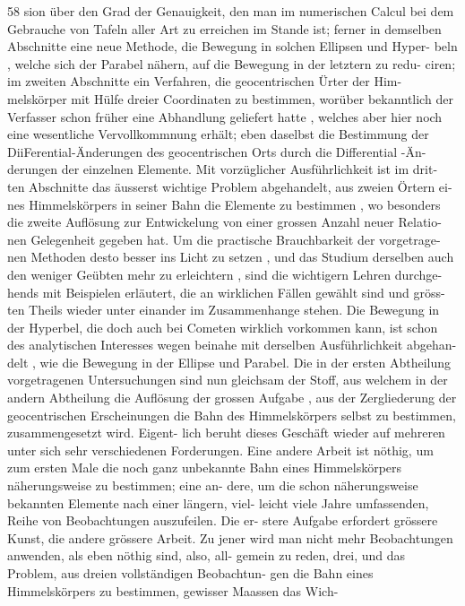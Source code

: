 \documentclass[12pt,a4paper]{article}
\begin{document}
\newpage

58
sion  über  den  Grad  der  Genauigkeit,  den  man  im  numerischen  Calcul  bei  dem
Gebrauche  von  Tafeln  aller  Art  zu  erreichen  im  Stande  ist;  ferner  in  demselben
Abschnitte  eine  neue  Methode,  die  Bewegung  in  solchen  Ellipsen  und  Hyper-
beln ,  welche  sich  der  Parabel  nähern,  auf  die  Bewegung  in  der  letztern  zu  redu-
ciren;  im  zweiten  Abschnitte  ein  Verfahren,  die  geocentrischen  Ürter  der  Him-
melskörper mit  Hülfe  dreier  Coordinaten  zu  bestimmen,  worüber  bekanntlich
der  Verfasser  schon  früher  eine  Abhandlung  geliefert  hatte ,  welches  aber  hier
noch  eine  wesentliche  Vervollkommnung  erhält;  eben  daselbst  die  Bestimmung
der  DiiFerential-Änderungen  des  geocentrischen  Orts  durch  die  Differential -Än-
derungen der  einzelnen  Elemente.  Mit  vorzüglicher  Ausführlichkeit  ist  im  drit-
ten Abschnitte  das  äusserst  wichtige  Problem  abgehandelt,  aus  zweien  Örtern  ei-
nes Himmelskörpers  in  seiner  Bahn  die  Elemente  zu  bestimmen ,  wo  besonders
die  zweite  Auflösung  zur  Entwickelung  von  einer  grossen  Anzahl  neuer  Relatio-
nen Gelegenheit  gegeben  hat.  Um  die  practische  Brauchbarkeit  der  vorgetrage-
nen Methoden  desto  besser  ins  Licht  zu  setzen ,  und  das  Studium  derselben  auch
den  weniger  Geübten  mehr  zu  erleichtern ,  sind  die  wichtigern  Lehren  durchge-
hends  mit  Beispielen  erläutert,  die  an  wirklichen  Fällen  gewählt  sind  und  gröss-
ten  Theils  wieder  unter  einander  im  Zusammenhange  stehen.  Die  Bewegung  in
der  Hyperbel,  die  doch  auch  bei  Cometen  wirklich  vorkommen  kann,  ist  schon
des  analytischen  Interesses  wegen  beinahe  mit  derselben  Ausführlichkeit  abgehan-
delt ,  wie  die  Bewegung  in  der  Ellipse  und  Parabel.
Die  in  der  ersten  Abtheilung  vorgetragenen  Untersuchungen  sind  nun
gleichsam  der  Stoff,  aus  welchem  in  der  andern  Abtheilung  die  Auflösung  der
grossen  Aufgabe ,  aus  der  Zergliederung  der  geocentrischen  Erscheinungen  die
Bahn  des  Himmelskörpers  selbst  zu  bestimmen,  zusammengesetzt  wird.  Eigent-
lich beruht  dieses  Geschäft  wieder  auf  mehreren  unter  sich  sehr  verschiedenen
Forderungen.  Eine  andere  Arbeit  ist  nöthig,  um  zum  ersten  Male  die  noch  ganz
unbekannte  Bahn  eines  Himmelskörpers  näherungsweise  zu  bestimmen;  eine  an-
dere, um  die  schon  näherungsweise  bekannten  Elemente  nach  einer  längern,  viel-
leicht viele  Jahre  umfassenden,  Reihe  von  Beobachtungen  auszufeilen.  Die  er-
stere  Aufgabe  erfordert  grössere  Kunst,  die  andere  grössere  Arbeit.  Zu  jener
wird  man  nicht  mehr  Beobachtungen  anwenden,  als  eben  nöthig  sind,  also,  all-
gemein zu  reden,  drei,  und  das  Problem,  aus  dreien  vollständigen  Beobachtun-
gen die  Bahn  eines  Himmelskörpers  zu  bestimmen,  gewisser  Maassen  das  Wich-
\end{document}
